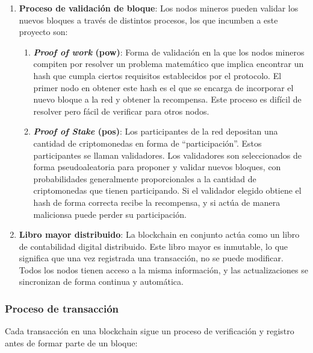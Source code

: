 \begin{enumerate}
    
    \item \textbf{Proceso de validación de bloque}: Los nodos mineros pueden validar los nuevos bloques a través de 
    distintos procesos, los que incumben a este proyecto son:
        \begin{enumerate}
          \item \textbf{\textit{Proof of work} (\gls{pow})}: Forma de validación en la que los nodos 
          mineros compiten por resolver un problema matemático que implica encontrar un \gls{hash} 
          que cumpla ciertos requisitos establecidos por el protocolo. El primer nodo en obtener este \gls{hash}
          es el que se encarga de incorporar el nuevo bloque a la red y obtener la recompensa.
          Este proceso es difícil de resolver pero fácil de verificar para otros nodos.
          \item \textbf{\textit{Proof of Stake} (\gls{pos})}: Los participantes de la red depositan 
          una cantidad de criptomonedas en forma de \enquote{participación}.
          Estos participantes se llaman validadores. Los validadores son seleccionados de forma 
          pseudoaleatoria para proponer y validar nuevos bloques, con probabilidades generalmente
          proporcionales a la cantidad de criptomonedas que tienen participando. 
          Si el validador elegido obtiene el \gls{hash} de forma correcta recibe la recompensa,
          y si actúa de manera malicionsa puede perder su participación.
\end{enumerate}

    \item \textbf{Libro mayor distribuido}: La \gls{blockchain} en conjunto actúa como un libro 
    de contabilidad digital distribuido. Este libro mayor es inmutable, lo que significa que una 
    vez registrada una transacción, no se puede modificar. 
    Todos los nodos tienen acceso a la misma información, y las actualizaciones se sincronizan 
    de forma continua y automática.
\end{enumerate}

\subsubsection{Proceso de transacción}

Cada transacción en una blockchain sigue un proceso de verificación y registro antes de formar 
parte de un bloque:

